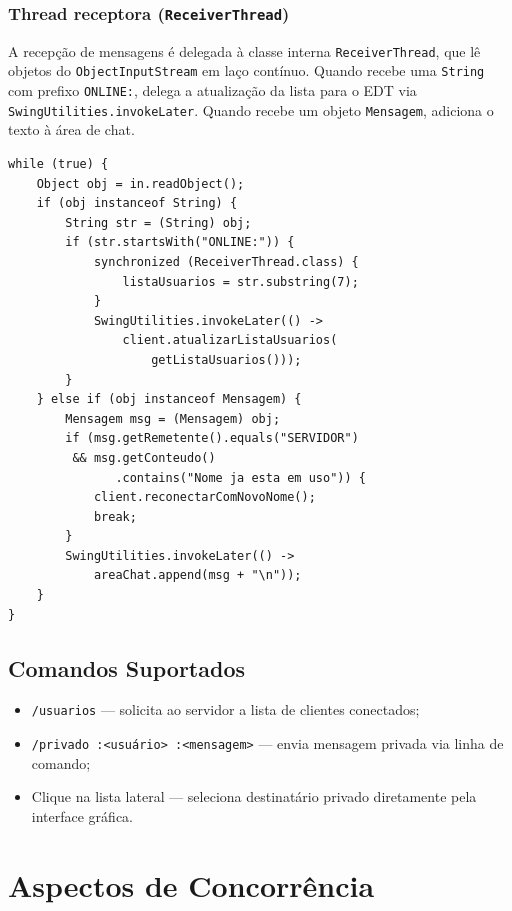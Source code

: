\documentclass[10pt,twocolumn,a4paper]{article}
\begin{document}
\subsubsection{Thread receptora (\texttt{ReceiverThread})}

A recepção de mensagens é delegada à classe interna \texttt{ReceiverThread},
que lê objetos do \texttt{ObjectInputStream} em laço contínuo. Quando recebe
uma \texttt{String} com prefixo \texttt{ONLINE:}, delega a atualização da lista
para o EDT via \texttt{SwingUtilities.invokeLater}. Quando recebe um objeto
\texttt{Mensagem}, adiciona o texto à área de chat.

\begin{lstlisting}[caption={Loop principal do ReceiverThread}]
while (true) {
    Object obj = in.readObject();
    if (obj instanceof String) {
        String str = (String) obj;
        if (str.startsWith("ONLINE:")) {
            synchronized (ReceiverThread.class) {
                listaUsuarios = str.substring(7);
            }
            SwingUtilities.invokeLater(() ->
                client.atualizarListaUsuarios(
                    getListaUsuarios()));
        }
    } else if (obj instanceof Mensagem) {
        Mensagem msg = (Mensagem) obj;
        if (msg.getRemetente().equals("SERVIDOR")
         && msg.getConteudo()
               .contains("Nome ja esta em uso")) {
            client.reconectarComNovoNome();
            break;
        }
        SwingUtilities.invokeLater(() ->
            areaChat.append(msg + "\n"));
    }
}
\end{lstlisting}

\subsection{Comandos Suportados}

\begin{itemize}
    \item \texttt{/usuarios} — solicita ao servidor a lista de clientes
          conectados;
    \item \texttt{/privado :<usuário> :<mensagem>} — envia mensagem privada
          via linha de comando;
    \item Clique na lista lateral — seleciona destinatário privado diretamente
          pela interface gráfica.
\end{itemize}


\section{Aspectos de Concorrência}
\end{document}
